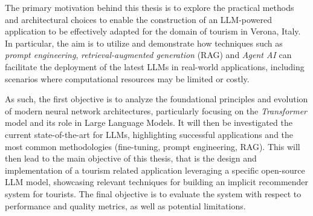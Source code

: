 The primary motivation behind this thesis is to explore the practical methods and architectural choices to enable the construction of an LLM-powered application to be effectively adapted for the domain of tourism in Verona, Italy. In particular, the aim is to utilize and demonstrate how techniques such as \textit{prompt engineering}, \textit{retrieval-augmented generation} (RAG) and \textit{Agent AI} can facilitate the deployment of the latest LLMs in real-world applications, including scenarios where computational resources may be limited or costly.

As such, the first objective is to analyze the foundational principles and evolution of modern neural network architectures, particularly focusing on the \textit{Transformer} model and its role in Large Language Models. It will then be investigated the current state-of-the-art for LLMs, highlighting successful applications and the most common methodologies (fine-tuning, prompt engineering, RAG). This will then lead to the main objective of this thesis, that is the design and implementation of a tourism related application leveraging a specific open-source LLM model, showcasing relevant techniques for building an implicit recommender system for tourists. The final objective is to evaluate the system with respect to performance and quality metrics, as well as potential limitations.



